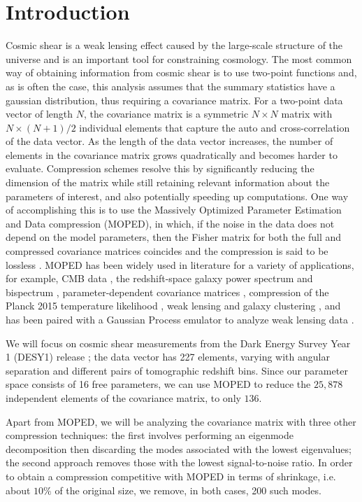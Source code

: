 \documentclass[twocolumn,nofootinbib]{\docclass}
\begin{document}
\section{Introduction}
\label{sec:introduction}
Cosmic shear is a weak lensing effect caused by the large-scale structure of the universe and is an important tool for constraining cosmology. The most common way of obtaining information from cosmic shear is to use two-point functions and, as is often the case, this analysis assumes that the summary statistics have a gaussian distribution, thus requiring a covariance matrix. For a two-point data vector of length $N$, the covariance matrix is a symmetric $N\times N$ matrix with $N\times (N+1)/2$ individual elements that capture the auto and cross-correlation of the data vector. As the length of the data vector increases, the number of elements in the covariance matrix grows quadratically and becomes harder to evaluate. Compression schemes resolve this by significantly reducing the dimension of the matrix while still retaining relevant information about the parameters of interest, and also potentially speeding up computations. One way of accomplishing this is to use the Massively Optimized Parameter Estimation and Data compression (MOPED), in which, if the noise in the data does not depend on the model parameters, then the Fisher matrix for both the full and compressed covariance matrices coincides and the compression is said to be lossless \cite{Heavens:2000hjl, Tegmark:1997maa}. MOPED has been widely used in literature for a variety of applications, for example, CMB data \cite{Zablocki:2015zcm}, the redshift-space galaxy power spectrum and bispectrum \cite{Gualdi:2018mjl}, parameter-dependent covariance matrices \cite{Heavens:2017smv}, compression of the Planck 2015 temperature likelihood \cite{Heather:2019d}, weak lensing and galaxy clustering \cite{Ruggeri:2020rb}, and has been paired with a Gaussian Process emulator to analyze weak lensing data \cite{Mootoovaloo:2020}.

We will focus on cosmic shear measurements from the Dark Energy Survey Year 1 (DESY1) release \cite{Troxel:2017xyo,Abbott:2018cms}; the data vector has 227 elements, varying with angular separation and different pairs of tomographic redshift bins. Since our parameter space consists of 16 free parameters, we can use MOPED to reduce the $25,878$ independent elements of the covariance matrix, to only $136$.

Apart from MOPED, we will be analyzing the covariance matrix with three other compression techniques: the first involves performing an eigenmode decomposition then discarding the modes associated with the lowest eigenvalues; the second approach removes those with the lowest signal-to-noise ratio. In order to obtain a compression competitive with MOPED in terms of shrinkage, i.e. about $10\%$ of the original size, we remove, in both cases, 200 such modes.
\end{document}
